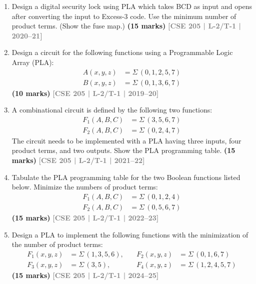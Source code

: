 \documentclass[12pt,a4paper]{article}
\newcommand{\yr}[1]{\hfill\textcolor{gray}{\small\textbf{[#1]}}}
\newcommand{\mk}[1]{\textcolor{orange!70!black}{\small\textbf{(#1 marks)}}}
\begin{document}
\begin{enumerate}
\item Design a digital security lock using PLA which takes BCD as input and opens after converting the input to Excess-3 code. Use the minimum number of product terms. (Show the fuse map.)
\mk{15} \yr{CSE 205 | L-2/T-1 | 2020--21}


\item Design a circuit for the following functions using a Programmable Logic Array (PLA):
\begin{align*}
  A(x,y,z) &= \Sigma\,(0,1,2,5,7) \\
  B(x,y,z) &= \Sigma\,(0,1,3,6,7)
\end{align*}
\mk{10} \yr{CSE 205 | L-2/T-1 | 2019--20}

\item A combinational circuit is defined by the following two functions:
\begin{align*}
  F_1(A, B, C) &= \Sigma\,(3, 5, 6, 7) \\
  F_2(A, B, C) &= \Sigma\,(0, 2, 4, 7)
\end{align*}
The circuit needs to be implemented with a PLA having three inputs, four product terms, and two outputs. Show the PLA programming table.
\mk{15} \yr{CSE 205 | L-2/T-1 | 2021--22}

\item Tabulate the PLA programming table for the two Boolean functions listed below. Minimize the numbers of product terms:
\begin{align*}
  F_1(A, B, C) &= \Sigma\,(0, 1, 2, 4) \\
  F_2(A, B, C) &= \Sigma\,(0, 5, 6, 7)
\end{align*}
\mk{15} \yr{CSE 205 | L-2/T-1 | 2022--23}

\item Design a PLA to implement the following functions with the minimization of the number of product terms:
\begin{align*}
  F_1(x, y, z) &= \Sigma\,(1,3,5,6),\quad & F_2(x, y, z) &= \Sigma\,(0,1,6,7) \\
  F_3(x, y, z) &= \Sigma\,(3,5),\quad & F_4(x, y, z) &= \Sigma\,(1,2,4,5,7)
\end{align*}
\mk{15} \yr{CSE 205 | L-2/T-1 | 2024--25}

\end{enumerate}
\end{document}
